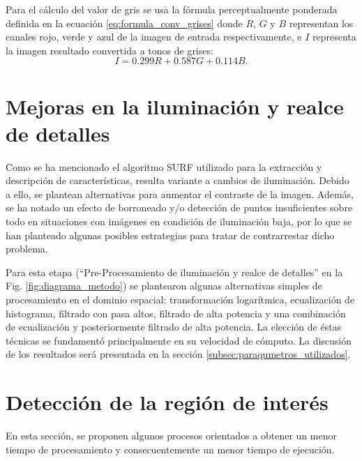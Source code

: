 Para el cálculo del valor de gris se usa la fórmula perceptualmente ponderada definida en la ecuación \eqref{eq:formula_conv_grises} donde $R$, $G$ y $B$ representan los canales rojo, verde y azul de la imagen de entrada respectivamente, e $I$ representa la imagen resultado convertida a tonos de grises:%
\begin{equation}
\label{eq:formula_conv_grises}
I=0.299R+0.587G+0.114B.
\end{equation}
\section{Mejoras en la iluminación y realce de detalles}
\label{sec:mejoras_ilum_detalles_metodo}
Como se ha mencionado el algoritmo SURF utilizado para la extracción y descripción de características, resulta variante a cambios de iluminación. Debido a ello, se plantean alternativas para aumentar el contraste de la imagen. Además, se ha notado un efecto de borroneado y/o detección de puntos insuficientes sobre todo en situaciones con imágenes en condición de iluminación baja, por lo que se han planteado algunas posibles estrategias para tratar de contrarrestar dicho problema.

Para esta etapa (``Pre-Procesamiento de iluminación y realce de detalles'' en la Fig. \ref{fig:diagrama_metodo}) se plantearon algunas alternativas simples de procesamiento en el dominio espacial: transformación logarítmica, ecualización de histograma, filtrado con pasa altos, filtrado de alta potencia y una combinación de ecualización y posteriormente filtrado de alta potencia. La elección de éstas técnicas se fundamentó principalmente en su velocidad de cómputo. La discusión de los resultados será presentada en la sección \ref{subsec:paraqumetros_utilizados}.
\section{Detección de la región de interés}
\label{sec:deteccion_cambiante_imagen}
En esta sección, se proponen algunos procesos orientados a obtener un menor tiempo de procesamiento y consecuentemente un menor tiempo de ejecución.

